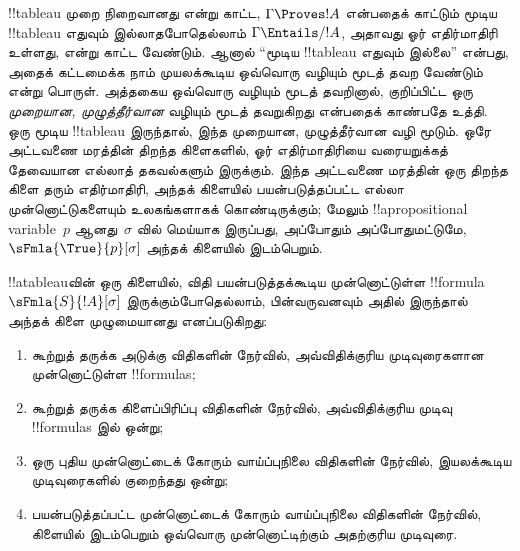 \documentclass[../../../include/open-logic-section]{subfiles}
\begin{document}


\begin{explain}
  !!{tableau} முறை நிறைவானது என்று காட்ட, $\Gamma \Proves !A$ என்பதைக்
  காட்டும் மூடிய !!{tableau} எதுவும் இல்லாதபோதெல்லாம் $\Gamma \Entails/
  !A$, அதாவது ஓர் எதிர்மாதிரி உள்ளது, என்று காட்ட வேண்டும். ஆனால் ``மூடிய
  !!{tableau} எதுவும் இல்லை'' என்பது, அதைக் கட்டமைக்க நாம் முயலக்கூடிய
  ஒவ்வொரு வழியும் மூடத் தவற வேண்டும் என்று பொருள். அத்தகைய ஒவ்வொரு வழியும்
  மூடத் தவறினால், குறிப்பிட்ட ஒரு \emph{முறையான, முழுத்தீர்வான} வழியும்
  மூடத் தவறுகிறது என்பதைக் காண்பதே உத்தி. ஒரு மூடிய !!{tableau} இருந்தால்,
  இந்த முறையான, முழுத்தீர்வான வழி மூடும். ஒரே அட்டவணை மரத்தின் திறந்த
  கிளைகளில், ஓர் எதிர்மாதிரியை வரையறுக்கத் தேவையான எல்லாத் தகவல்களும்
  இருக்கும். இந்த அட்டவணை மரத்தின் ஒரு திறந்த கிளை தரும் எதிர்மாதிரி, அந்தக்
  கிளையில் பயன்படுத்தப்பட்ட எல்லா முன்னொட்டுகளையும் உலகங்களாகக் கொண்டிருக்கும்;
  மேலும் !!a{propositional variable}~$p$ ஆனது~$\sigma$ வில் மெய்யாக
  இருப்பது, அப்போதும் அப்போதுமட்டுமே, $\sFmla{\True}{p}[\sigma]$ அந்தக்
  கிளையில் இடம்பெறும்.
\end{explain}

\begin{defn}
  !!a{tableau}வின் ஒரு கிளையில், விதி பயன்படுத்தக்கூடிய முன்னொட்டுள்ள
  !!{formula}~$\sFmla{S}{!A}[\sigma]$ இருக்கும்போதெல்லாம், பின்வருவனவும்
  அதில் இருந்தால் அந்தக் கிளை முழுமையானது எனப்படுகிறது:
  \begin{enumerate}
    \item கூற்றுத் தருக்க அடுக்கு விதிகளின் நேர்வில், அவ்விதிக்குரிய
      முடிவுரைகளான முன்னொட்டுள்ள !!{formula}s;
    \item கூற்றுத் தருக்க கிளைப்பிரிப்பு விதிகளின் நேர்வில், அவ்விதிக்குரிய
      முடிவு !!{formula}s இல் ஒன்று;
    \item ஒரு புதிய முன்னொட்டைக் கோரும் வாய்ப்புநிலை விதிகளின் நேர்வில்,
      இயலக்கூடிய முடிவுரைகளில் குறைந்தது ஒன்று;
    \item பயன்படுத்தப்பட்ட முன்னொட்டைக் கோரும் வாய்ப்புநிலை விதிகளின்
      நேர்வில், கிளையில் இடம்பெறும் ஒவ்வொரு முன்னொட்டிற்கும் அதற்குரிய
      முடிவுரை.
  \end{enumerate}
\end{defn}
\end{document}
